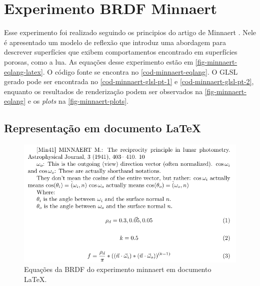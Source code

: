 \section{Experimento BRDF Minnaert}

Esse experimento foi realizado seguindo os principios do artigo de Minnaert \cite{minnaert1941reciprocity}. Nele é apresentado um modelo de reflexão que introduz uma abordagem para descrever superfícies que exibem comportamentos encontrado em superfícies porosas, como a lua.
As equações desse experimento estão em \autoref{fig-minnaert-eqlang-latex}. O código fonte se encontra no \autoref{cod-minnaert-eqlang}. O GLSL gerado pode ser encontrada no \autoref{cod-minnaert-glsl-pt-1} e \autoref{cod-minnaert-glsl-pt-2}, enquanto os resultados de renderização podem ser observados na \autoref{fig-minnaert-eqlang} e os \textit{plots} na \autoref{fig-minnaert-plots}.


\subsection{Representação em documento \LaTeX{}}
\begin{figure}[H]
    \caption{\label{fig-minnaert-eqlang-latex} \small Equações da BRDF do experimento minnaert em documento \LaTeX{}.}
    \begin{center}
        \includegraphics[scale=0.92]{./Imagens/brdfs/minnaert.pdf}
    \end{center}
\end{figure}


